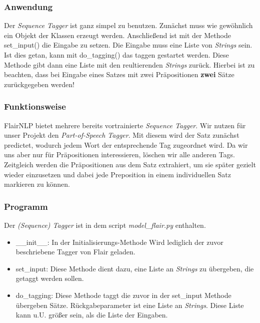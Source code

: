 \documentclass[10pt,a4paper]{article}
\begin{document}
\subsubsection{Anwendung}
Der \textit{Sequence Tagger} ist ganz simpel zu benutzen. Zunächst muss wie gewöhnlich ein Objekt der Klassen erzeugt werden. Anschließend ist mit der Methode set\_input() die Eingabe zu setzen. Die Eingabe muss eine Liste von \textit{Strings} sein. Ist dies getan, kann mit do\_tagging() das taggen gestartet werden. Diese Methode gibt dann eine Liste mit den reultierenden \textit{Strings} zurück. Hierbei ist zu beachten, dass bei Eingabe eines Satzes mit zwei Präpositionen \textbf{zwei} Sätze zurückgegeben werden!

\subsubsection{Funktionsweise}
FlairNLP bietet mehrere bereits vortrainierte \textit{Sequence Tagger}. Wir nutzen für unser Projekt den \textit{Part-of-Speech Tagger}. Mit diesem wird der Satz zunächst predictet, wodurch jedem Wort der entsprechende Tag zugeordnet wird. Da wir uns aber nur für Präpositionen interessieren, löschen wir alle anderen Tags. Zeitgleich werden die Präpositionen aus dem Satz extrahiert, um sie später gezielt wieder einzusetzen und dabei jede Preposition in einem individuellen Satz markieren zu können.

\subsubsection{Programm}
Der \textit{(Sequence) Tagger} ist in dem script \textit{model\_flair.py} enthalten.
\begin{itemize}
\item \_\_init\_\_: In der Initialisierungs-Methode Wird lediglich der zuvor beschriebene Tagger von Flair geladen.
\item set\_input: Diese Methode dient dazu, eine Liste an \textit{Strings} zu übergeben, die getaggt werden sollen.
\item do\_tagging: Diese Methode taggt die zuvor in der set\_input Methode übergeben Sätze. Rückgabeparameter ist eine Liste an \textit{Strings}. Diese Liste kann u.U. größer sein, als die Liste der Eingaben.
\end{itemize}
\end{document}
